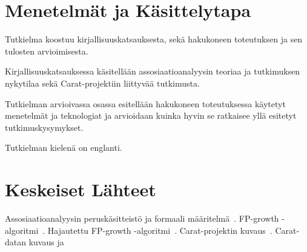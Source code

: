 \documentclass[finnish]{tktltiki2}
\theoremstyle{definition}
\theoremstyle{remark}
\begin{document}
\section*{Menetelmät ja Käsittelytapa}

Tutkielma koostuu kirjallisuuskatsauksesta, sekä hakukoneen toteutuksen ja sen tulosten arvioimisesta.

Kirjallisuuskatsauksessa käsitellään assosiaatioanalyysin teoriaa ja tutkimuksen nykytilaa sekä Carat-projektiin liittyvää tutkimusta.

Tutkielman arvioivassa osassa esitellään hakukoneen toteutuksessa käytetyt menetelmät ja teknologiat ja arvioidaan kuinka hyvin se ratkaisee yllä esitetyt tutkimuskysymykset.

Tutkielman kielenä on englanti.    

\section*{Keskeiset Lähteet}

Assosiaatioanalyysin peruskäsitteistö ja formaali määritelmä~\cite{Agrawal:1993:MAR:170036.170072}. FP-growth -algoritmi~\cite{Han:2000:MFP:335191.335372}. Hajautettu FP-growth -algoritmi~\cite{Li:2008:PPF:1454008.1454027}. Carat-projektin kuvaus~\cite{Oliner:2013:CCE:2517351.2517354}. Carat-datan kuvaus ja 


%
%
% 
%







% 
\end{document}
